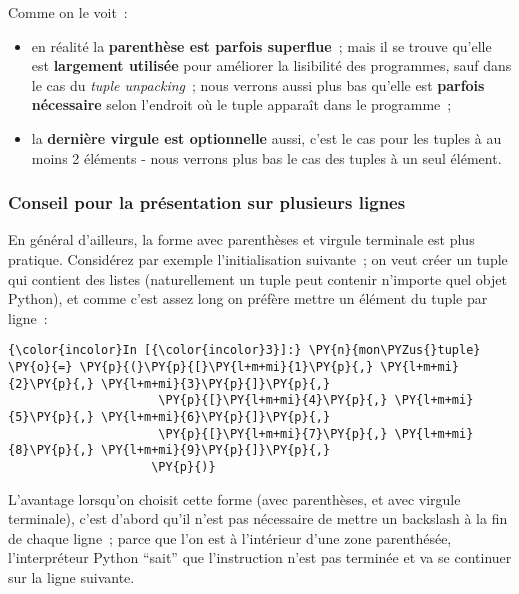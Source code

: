     Comme on le voit~:
    
\begin{itemize}
	\item 
	en réalité la \textbf{parenthèse est parfois
	superflue}~; mais il se trouve qu'elle est \textbf{largement utilisée}
	pour améliorer la lisibilité des programmes, sauf dans le cas du
	\emph{tuple unpacking}~; nous verrons aussi plus bas qu'elle est
	\textbf{parfois nécessaire} selon l'endroit où le tuple apparaît dans le
	programme~;
	\item
	la \textbf{dernière virgule est optionnelle} aussi, c'est
	le cas pour les tuples à au moins 2 éléments - nous verrons plus bas le
	cas des tuples à un seul élément.
\end{itemize}

    \hypertarget{conseil-pour-la-pruxe9sentation-sur-plusieurs-lignes}{%
\subsubsection{Conseil pour la présentation sur plusieurs
lignes}\label{conseil-pour-la-pruxe9sentation-sur-plusieurs-lignes}}

    En général d'ailleurs, la forme avec parenthèses et virgule terminale
est plus pratique. Considérez par exemple l'initialisation suivante~; on
veut créer un tuple qui contient des listes (naturellement un tuple peut
contenir n'importe quel objet Python), et comme c'est assez long on
préfère mettre un élément du tuple par ligne~:

    \begin{Verbatim}[commandchars=\\\{\}]
{\color{incolor}In [{\color{incolor}3}]:} \PY{n}{mon\PYZus{}tuple} \PY{o}{=} \PY{p}{(}\PY{p}{[}\PY{l+m+mi}{1}\PY{p}{,} \PY{l+m+mi}{2}\PY{p}{,} \PY{l+m+mi}{3}\PY{p}{]}\PY{p}{,}
                     \PY{p}{[}\PY{l+m+mi}{4}\PY{p}{,} \PY{l+m+mi}{5}\PY{p}{,} \PY{l+m+mi}{6}\PY{p}{]}\PY{p}{,}
                     \PY{p}{[}\PY{l+m+mi}{7}\PY{p}{,} \PY{l+m+mi}{8}\PY{p}{,} \PY{l+m+mi}{9}\PY{p}{]}\PY{p}{,}
                    \PY{p}{)}
\end{Verbatim}


    L'avantage lorsqu'on choisit cette forme (avec parenthèses, et avec
virgule terminale), c'est d'abord qu'il n'est pas nécessaire de mettre
un backslash à la fin de chaque ligne~; parce que l'on est à l'intérieur
d'une zone parenthésée, l'interpréteur Python ``sait'' que l'instruction
n'est pas terminée et va se continuer sur la ligne suivante.\\

